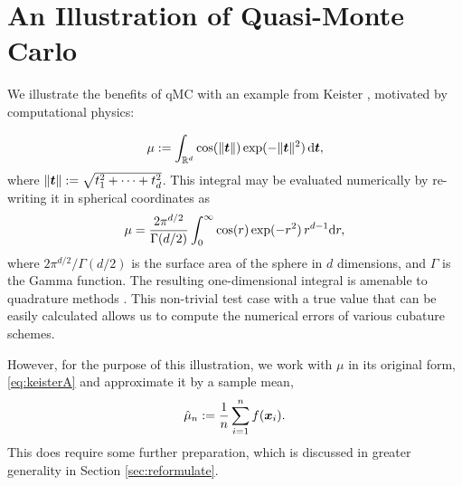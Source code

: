 \documentclass{svproc}
\begin{document}
%
\section{An Illustration of Quasi-Monte Carlo} \label{sec:practice}

We illustrate the benefits of qMC with an example from Keister \cite{Kei96}, motivated by computational physics:

\begin{equation}\label{eq:keisterA}
	\mu := \int_{\mathbb{R}^d} \cos(\lVert {\boldsymbol{t}} \rVert) \exp(-\lVert {\boldsymbol{t}} \rVert^2) \, {\mathrm{d}} {\boldsymbol{t}},
\end{equation}
where $\lVert {\boldsymbol{t}} \rVert := \sqrt{t_1^2 + \cdots + t_d^2}$.  This integral may be evaluated numerically by re-writing it in spherical coordinates as
\begin{equation}\label{eq:keisterExact}
	\mu = \frac{2 \pi^{d/2}}{\Gamma(d/2)}\int_{0}^{\infty} \cos(r) \exp(-r^2) \, r^{d-1} {\mathrm{d}} r,
\end{equation}
where $2 \pi^{d/2}/\Gamma(d/2)$ is the surface area of the sphere in $d$ dimensions, and $\Gamma$ is the Gamma function.  The resulting one-dimensional integral is amenable to quadrature methods \cite{}.  This non-trivial test case with a true value that can be easily calculated allows us to compute the numerical errors of various cubature schemes.

However, for the purpose of this illustration, we work with $\mu$ in its original form, \eqref{eq:keisterA} and approximate it by a sample mean,
\begin{equation} \label{eq:sample_mean}
	\hat{\mu}_n := \frac 1n \sum_{i=1}^n f({\boldsymbol{x}}_i).
\end{equation}
This does require some further preparation, which is discussed in greater generality in Section \ref{sec:reformulate}.
\end{document}
